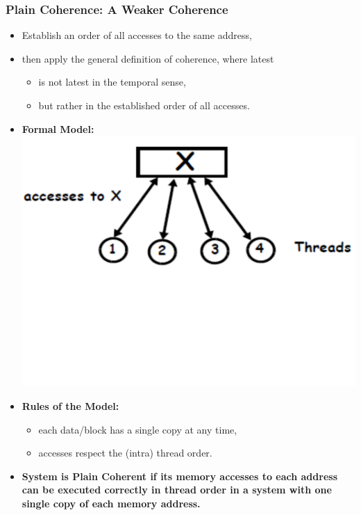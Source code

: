 \documentclass{beamer}
\newcommand{\emp}[1]{\textcolor{DikuRed}{ #1}}
\begin{document}
\begin{frame}[fragile,t]
\frametitle{Plain Coherence: A Weaker Coherence}

\begin{itemize}
    \item Establish an order of all accesses to the same address,
    \item then apply the general definition of coherence, where \emp{latest}
    \begin{itemize}
        \item is not latest in the temporal sense,
        \item but rather in the established order of all accesses.
    \end  {itemize}\medskip

    \item {\bf Formal Model:}\\
            \includegraphics[width=33ex]{Ch7Figs/PlainCoh1}\vspace{-13ex}
    
    \item {\bf Rules of the Model:}
    \begin{itemize}
        \item each data/block has a single copy at any time,
        \item accesses respect the (intra) thread order.
    \end  {itemize}\medskip

    \item \emp{\bf System is Plain Coherent if its memory accesses to each address
            can be executed correctly in thread order in a system with one single copy
            of each memory address.}
\end{itemize}

\end{frame}
\end{document}

